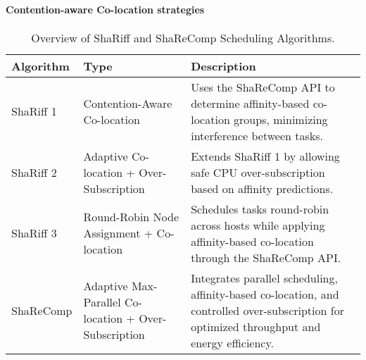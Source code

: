 \paragraph{Contention-aware Co-location strategies}
\label{sec:co-location_strategies}


\begin{table}[H]
    \centering
    \caption{Overview of ShaRiff and ShaReComp Scheduling Algorithms.}
    \label{tab:shariff_overview}
    \begin{tabularx}{\textwidth}{l l X}
        \toprule
        \textbf{Algorithm} & \textbf{Type}                                         & \textbf{Description}                                                                                                                         \\
        \midrule
        ShaRiff 1          & Contention-Aware Co-location                          & Uses the ShaReComp API to determine affinity-based co-location groups, minimizing interference between tasks.                                \\

        ShaRiff 2          & Adaptive Co-location + Over-Subscription              & Extends ShaRiff 1 by allowing safe CPU over-subscription based on affinity predictions.                                                      \\

        ShaRiff 3          & Round-Robin Node Assignment + Co-location             & Schedules tasks round-robin across hosts while applying affinity-based co-location through the ShaReComp API.                                \\

        ShaReComp          & Adaptive Max-Parallel Co-location + Over-Subscription & Integrates parallel scheduling, affinity-based co-location, and controlled over-subscription for optimized throughput and energy efficiency. \\
        \bottomrule
    \end{tabularx}
\end{table}


